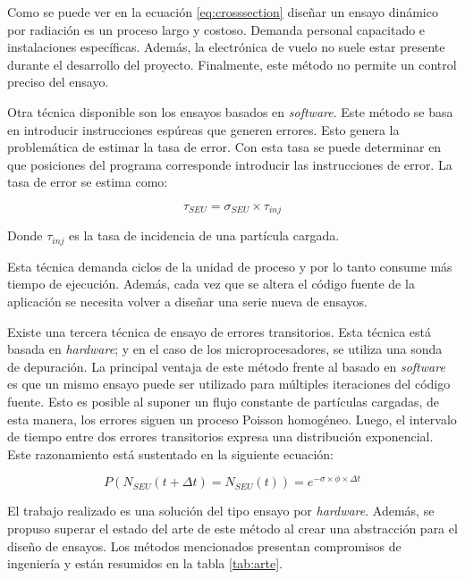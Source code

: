 Como se puede ver en la ecuación \ref{eq:crosssection} diseñar un ensayo dinámico por radiación es un proceso largo y costoso.
Demanda personal capacitado e instalaciones específicas.
Además, la electrónica de vuelo no suele estar presente durante el desarrollo del proyecto.
Finalmente, este método no permite un control preciso del ensayo.

Otra técnica disponible son los ensayos basados en \emph{software}.
Este método se basa en introducir instrucciones espúreas que generen errores.
Esto genera la problemática de estimar la tasa de error.
Con esta tasa se puede determinar en que posiciones del programa corresponde introducir las instrucciones de error.
La tasa de error se estima como:

\begin{equation}
	\label{eq:errorrate}
    \tau_{SEU} = \sigma_{SEU} \times \tau_{inj}
\end{equation}

Donde $ \tau_{inj} $ es la tasa de incidencia de una partícula cargada.

Esta técnica demanda ciclos de la unidad de proceso y por lo tanto consume más tiempo de ejecución.
Además, cada vez que se altera el código fuente de la aplicación se necesita volver a diseñar una serie nueva de ensayos.

Existe una tercera técnica de ensayo de errores transitorios.
Esta técnica está basada en \emph{hardware}; y en el caso de los microprocesadores, se utiliza una sonda de depuración.
La principal ventaja de este método frente al basado en \emph{software} es que un mismo ensayo puede ser utilizado para múltiples iteraciones del código fuente.
Esto es posible al suponer un flujo constante de partículas cargadas, de esta manera, los errores siguen un proceso Poisson homogéneo.
Luego, el intervalo de tiempo entre dos errores transitorios expresa una distribución exponencial.
Este razonamiento está sustentado en la siguiente ecuación:

\begin{equation}
	\label{eq:poisson}
    P(N_{SEU}(t + \Delta t) = N_{SEU}(t) ) = e^{-\sigma \times \phi \times \Delta t}
\end{equation}

El trabajo realizado es una solución del tipo ensayo por \emph{hardware}.
Además, se propuso superar el estado del arte de este método al crear una abstracción para el diseño de ensayos.
Los métodos mencionados presentan compromisos de ingeniería y están resumidos en la tabla \ref{tab:arte}.


